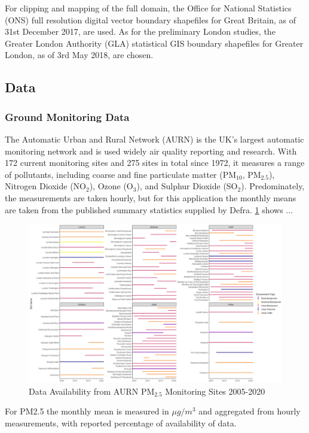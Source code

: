 For clipping and mapping of the full domain, the Office for National Statistics (ONS) full resolution digital vector boundary shapefiles for Great Britain, as of 31st December 2017, are used. As for the preliminary London studies, the Greater London Authority (GLA) statistical GIS boundary shapefiles for Greater London, as of 3rd May 2018, are chosen.

\subsection{Data}
\subsubsection{Ground Monitoring Data} 
The Automatic Urban and Rural Network (AURN) is the UK's largest automatic monitoring network and is used widely air quality reporting and research. With 172 current monitoring sites and 275 sites in total since 1972, it measures a range of pollutants, including coarse and fine particulate matter (PM$_{10}$, PM$_{2.5}$), Nitrogen Dioxide (NO$_{2}$), Ozone (O$_{3}$), and Sulphur Dioxide (SO$_{2}$). Predominately, the measurements are taken hourly, but for this application the monthly means are taken from the published summary statistics supplied by Defra. \ref{fig:aurn} shows ... 

\begin{figure}[h]
    \centering
    \includegraphics[width=1\textwidth]{Images/AURN Avaliability 2005-2020.png}
    \caption{Data Availability from AURN PM$_{2.5}$ Monitoring Sites 2005-2020}
    \label{fig:aurn}
\end{figure}

For PM2.5 the monthly mean is measured in $\mu g/m^3$ and aggregated from hourly measurements, with reported percentage of availability of data.

